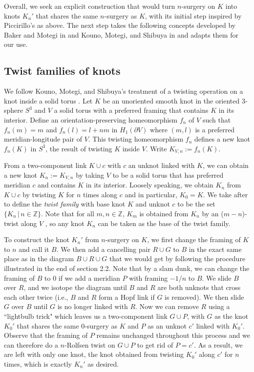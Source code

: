 \documentclass[11pt,usenames,dvipsnames,reqno]{amsart}
\numberwithin{theorem}{section}
\theoremstyle{ex}
\theoremstyle{rem}
\begin{document}
Overall, we seek an explicit construction that would turn $n$-surgery on $K$ into knots $K_n'$ that shares the same $n$-surgery as $K$, with its initial step inspired by Piccirillo's as above. The next step takes the following concepts developed by Baker and Motegi in \cite{baker-motegi} and Kouno, Motegi, and Shibuya in \cite{twisting-knot-types} and adapts them for our use.

\subsection{Twist families of knots}

We follow Kouno, Motegi, and Shibuya's treatment of a twisting operation on a knot inside a solid torus . Let $K$ be an unoriented smooth knot in the oriented 3-sphere $S^3$ and $V$ a solid torus with a preferred framing that contains $K$ in its interior. Define an orientation-preserving homeomorphism $f_n$ of $V$ such that $f_n(m)=m$ and  $f_n(l)=l+nm$ in $H_1(\partial V)$ where $(m, l)$ is a preferred meridian-longitude pair of $V$. This twisting homeomorphism $f_n$ defines a new knot $f_n(K)$ in $S^3$, the result of twisting $K$ inside $V$. Write $K_{V,n} := f_n(K)$. 

From a two-component link $K\cup c$ with $c$ an unknot linked with $K$, we can obtain a new knot $K_n := K_{V,n}$ by taking $V$ to be a solid torus that has preferred meridian $c$ and contains $K$ in its interior. Loosely speaking, we obtain $K_n$ from $K\cup c$ by twisting $K$ for $n$ times along $c$ and in particular, $K_0=K$. We take after \cite[Section 2]{baker-motegi} to define the \textit{twist family} with base knot $K$ and unknot $c$ to be the set $\{K_n \,|\, n \in \mathbb{Z}\}$. Note that for all $m, n\in\mathbb{Z}$,  $K_m$ is obtained from $K_n$ by an ($m-n$)-twist along $V$ \cite[Remark 2.2]{twisting-knot-types}, so any knot $K_n$ can be taken as the base of the twist family.

To construct the knot $K_n'$ from $n$-surgery on $K$, we first change the framing of $K$ to $n$ and call it $B$. We then add a cancelling pair $R \cup G$ to $B$ in the exact same place as in the diagram $B\cup R \cup G$ that we would get by following the procedure illustrated in the end of section 2.2. Note that by a slam dunk, we can change the framing of $B$ to 0 if we add a meridian $P$ with framing $-1/n$ to $B$. We slide $B$ over $R$, and we isotope the diagram until $B$ and $R$ are both unknots that cross each other twice (i.e., $B$ and $R$ form a Hopf link if $G$ is removed). We then slide $G$ over $B$ until $G$ is no longer linked with $R$. Now we can remove $R$ using a ``lightbulb trick" which leaves us a two-component link $G\cup P$, with $G$ as the knot $K_0'$ that shares the same 0-surgery as $K$ and $P$ as an unknot $c'$ linked with $K_0'$. Observe that the framing of $P$ remains unchanged throughout this process and we can therefore do a $n$-Rolfsen twist on $G\cup P$ to get rid of $P=c'$. As a result, we are left with only one knot, the knot obtained from twisting $K_0'$ along $c'$ for $n$ times, which is exactly $K_n'$ as desired.
\end{document}
